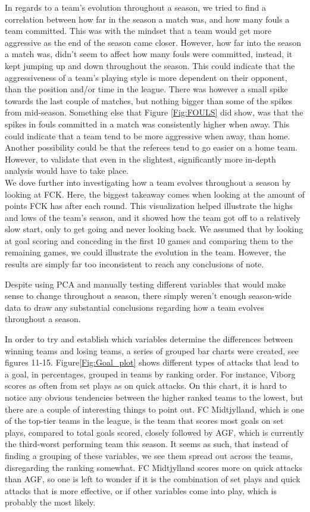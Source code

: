 \documentclass[Report.tex]{subfiles}
\begin{document}
In regards to a team's evolution throughout a season, we tried to find a correlation between how far in the season a match was, and how many fouls a team committed.
This was with the mindset that a team would get more aggressive as the end of the season came closer. However, how far into the season a match was, didn't seem to affect how many fouls were committed, instead, it kept jumping up and down throughout the season. This could indicate that the aggressiveness of a team's playing style is more dependent on their opponent, than the position and/or time in the league. There was however a small spike towards the last couple of matches, but nothing bigger than some of the spikes from mid-season. Something else that Figure \ref{Fig:FOULS} did show, was that the spikes in fouls committed in a match was consistently higher when away. This could indicate that a team tend to be more aggressive when away, than home. Another possibility could be that the referees tend to go easier on a home team. However, to validate that even in the slightest, significantly more in-depth analysis would have to take place. \\

We dove further into investigating how a team evolves throughout a season by looking at FCK. Here, the biggest takeaway comes when looking at the amount of points FCK has after each round. This visualization helped illustrate the highs and lows of the team’s season, and it showed how the team got off to a relatively slow start, only to get going and never looking back. We assumed that by looking at goal scoring and conceding in the first 10 games and comparing them to the remaining games, we could illustrate the evolution in the team. However, the results are simply far too inconsistent to reach any conclusions of note. 

Despite using PCA and manually testing different variables that would make sense to change throughout a season, there simply weren't enough season-wide data to draw any substantial conclusions regarding how a team evolves throughout a season.

In order to try and establish which variables determine the differences between
winning teams and losing teams, a series of grouped bar charts were created, see
figures 11-15. Figure\ref{Fig:Goal_plot} shows different types of attacks that lead to a goal,
in percentages, grouped in teams by ranking order. For instance, Viborg scores
as often from set plays as on quick attacks.
On this chart, it is hard to notice any obvious tendencies between the higher
ranked teams to the lowest, but there are a couple of interesting things to
point out. FC Midtjylland, which is one of the top-tier teams in the league, is
the team that scores most goals on set plays, compared to total goals scored,
closely followed by AGF, which is currently the third-worst performing team
this season. It seems as such, that instead of finding a grouping of these
variables, we see them spread out across the teams, disregarding the ranking
somewhat. FC Midtjylland scores more on quick attacks than AGF, so one is left
to wonder if it is the combination of set plays and quick attacks that is more
effective, or if other variables come into play, which is probably the most
likely. 
\end{document}
